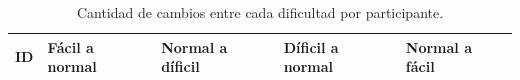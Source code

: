\begin{table}[H]
    \centering
    \caption{Cantidad de cambios entre cada dificultad por participante.}
    \label{tab:cambiosPorDificultad}

    \renewcommand{\arraystretch}{1.3}
    \setlength{\tabcolsep}{4pt}

    \begin{tabularx}{\textwidth}{
        |>{\centering\arraybackslash}X
        |>{\centering\arraybackslash}X
        |>{\centering\arraybackslash}X
        |>{\centering\arraybackslash}X
        |>{\centering\arraybackslash}X|
    }
        \hline

        \textbf{ID} &
        \textbf{Fácil a normal} &
        \textbf{Normal a díficil} &
        \textbf{Díficil a normal} &
        \textbf{Normal a fácil} \\ \hline


\end{tabularx}
\end{table}
